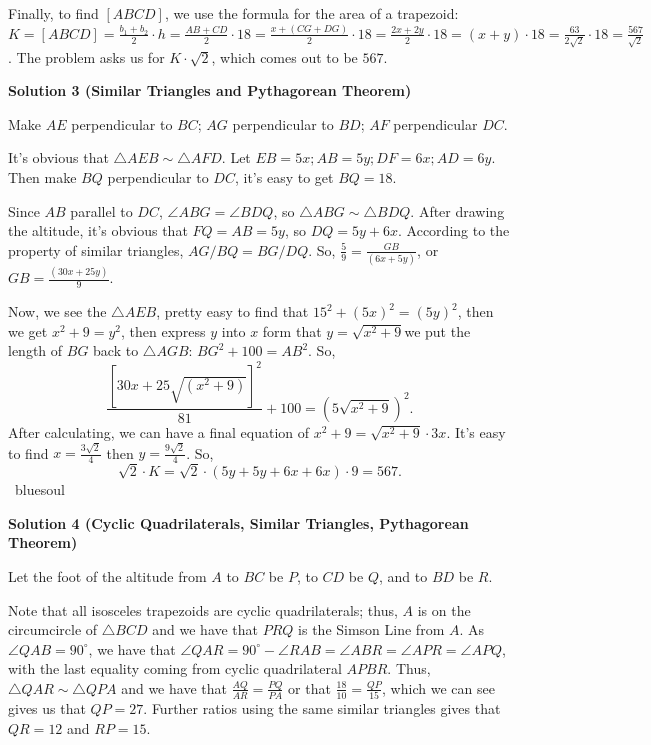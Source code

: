 \begin{enumerate}
 Finally, to find $[ABCD]$, we use the formula for the area of a trapezoid: $K = [ABCD] = \frac{b_{1}+b_{2}}{2} \cdot h = \frac{AB+CD}{2} \cdot 18 = \frac{x+(CG+DG)}{2} \cdot 18 = \frac{2x+2y}{2} \cdot 18 = (x+y) \cdot 18 = \frac{63}{2\sqrt{2}} \cdot 18 = \frac{567}{\sqrt{2}}$. The problem asks us for $K \cdot \sqrt{2}$, which comes out to be $\boxed{567}$.

 



\textbf{Solution 3 (Similar Triangles and Pythagorean Theorem)}

Make $AE$ perpendicular to $BC$; $AG$ perpendicular to $BD$; $AF$ perpendicular $DC$.

 It's obvious that $\triangle{AEB} \sim \triangle{AFD}$. Let $EB=5x; AB=5y; DF=6x; AD=6y$. Then make $BQ$ perpendicular to $DC$, it's easy to get $BQ=18$.

 Since $AB$ parallel to $DC$, $\angle{ABG}=\angle{BDQ}$, so $\triangle{ABG} \sim \triangle{BDQ}$. After drawing the altitude, it's obvious that $FQ=AB=5y$, so $DQ=5y+6x$. According to the property of similar triangles, $AG/BQ=BG/DQ$. So, $\frac{5}{9}=\frac{GB}{(6x+5y)}$, or $GB=\frac{(30x+25y)}{9}$.

 Now, we see the $\triangle AEB$, pretty easy to find that $15^2+(5x)^2=(5y)^2$, then we get $x^2+9=y^2$, then express $y$ into $x$ form that $y=\sqrt{x^2+9}$we put the length of $BG$ back to $\triangle AGB$: $BG^2+100=AB^2$. So, 
 \[\frac{[30x+25\sqrt{(x^2+9)}]^2}{81}+100=(5\sqrt{x^2+9})^2.\]After calculating, we can have a final equation of $x^2+9=\sqrt{x^2+9}\cdot3x$. It's easy to find $x=\frac{3\sqrt{2}}{4}$ then $y=\frac{9\sqrt{2}}{4}$. So, 
 \[\sqrt{2}\cdot K = \sqrt{2}\cdot(5y+5y+6x+6x)\cdot9=\boxed{567}.\]~bluesoul

 



\textbf{Solution 4 (Cyclic Quadrilaterals, Similar Triangles, Pythagorean Theorem)}

Let the foot of the altitude from $A$ to $BC$ be $P$, to $CD$ be $Q$, and to $BD$ be $R$.

 Note that all isosceles trapezoids are cyclic quadrilaterals; thus, $A$ is on the circumcircle of $\triangle BCD$ and we have that $PRQ$ is the Simson Line from $A$. As $\angle QAB = 90^\circ$, we have that $\angle QAR = 90^\circ - \angle RAB =\angle ABR = \angle APR = \angle APQ$, with the last equality coming from cyclic quadrilateral $APBR$. Thus, $\triangle QAR \sim \triangle QPA$ and we have that $\frac{AQ}{AR} = \frac{PQ}{PA}$ or that $\frac{18}{10} = \frac{QP}{15}$, which we can see gives us that $QP = 27$. Further ratios using the same similar triangles gives that $QR = 12$ and $RP = 15$.


\end{enumerate}
